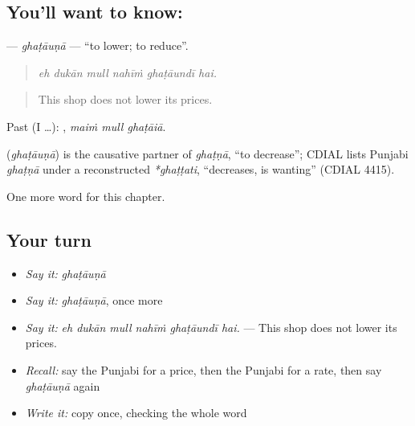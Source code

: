 \subsection*{You'll want to know: }
\textbf{} — \emph{ghaṭāuṇā} — \textquotedblleft{}to lower; to reduce\textquotedblright{}.

\begin{quote}
     
\end{quote}

\begin{quote}
\emph{eh dukān mull nahīṁ ghaṭāundī hai.}
\end{quote}

\begin{quote}
This shop does not lower its prices.
\end{quote}

Past (I …):   , \emph{maiṁ mull ghaṭāiā}.

\begin{cousinweb}
\textbf{} (\emph{ghaṭāuṇā}) is the causative partner of \emph{ghaṭṇā}, \textquotedblleft{}to decrease\textquotedblright{}; CDIAL lists Punjabi \emph{ghaṭṇā} under a reconstructed \emph{*ghaṭṭati}, \textquotedblleft{}decreases, is wanting\textquotedblright{} (CDIAL 4415).
\end{cousinweb}

\begin{grammarlens}[title={What you've built}]
One more word for this chapter.
\end{grammarlens}

\subsection*{Your turn}
\begin{itemize}
\raggedright
  \item \emph{Say it:} \emph{ghaṭāuṇā}
  \item \emph{Say it:} \emph{ghaṭāuṇā}, once more
  \item \emph{Say it:} \emph{eh dukān mull nahīṁ ghaṭāundī hai.} — This shop does not lower its prices.
  \item \emph{Recall:} say the Punjabi for a price, then the Punjabi for a rate, then say \emph{ghaṭāuṇā} again
  \item \emph{Write it:} copy \textbf{} once, checking the whole word
\end{itemize}

